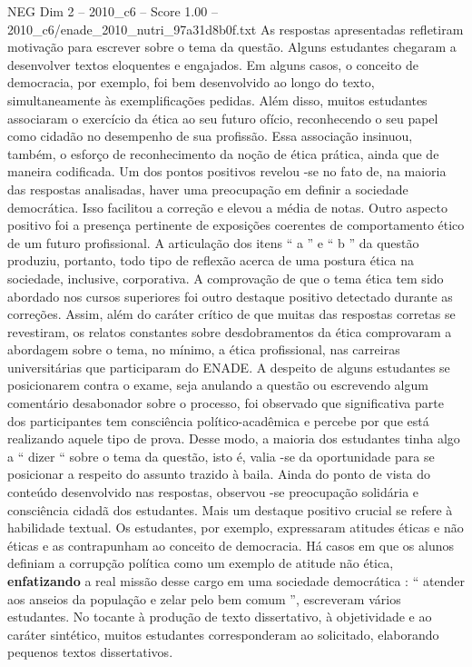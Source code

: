 \begin{textsample}{NEG Dim 2 – 2010\_c6 – Score 1.00 – 2010\_c6/enade\_2010\_nutri\_97a31d8b0f.txt}
As respostas apresentadas refletiram motivação para escrever sobre o tema da questão.
Alguns estudantes chegaram a desenvolver textos eloquentes e engajados.
Em alguns casos, o conceito de democracia, por exemplo, foi bem desenvolvido ao longo do texto, simultaneamente às exemplificações pedidas.
Além disso, muitos estudantes associaram o exercício da ética ao seu futuro ofício, reconhecendo o seu papel como cidadão no desempenho de sua profissão.
Essa associação insinuou, também, o esforço de reconhecimento da noção de ética prática, ainda que de maneira codificada.
Um dos pontos positivos revelou -se no fato de, na maioria das respostas analisadas, haver uma preocupação em definir a sociedade democrática.
Isso facilitou a correção e elevou a média de notas.
Outro aspecto positivo foi a presença pertinente de exposições coerentes de comportamento ético de um futuro profissional.
A articulação dos itens “ a ” e “ b ” da questão produziu, portanto, todo tipo de reflexão acerca de uma postura ética na sociedade, inclusive, corporativa.
A comprovação de que o tema ética tem sido abordado nos cursos superiores foi outro destaque positivo detectado durante as correções.
Assim, além do caráter crítico de que muitas das respostas corretas se revestiram, os relatos constantes sobre desdobramentos da ética comprovaram a abordagem sobre o tema, no mínimo, a ética profissional, nas carreiras universitárias que participaram do ENADE.
A despeito de alguns estudantes se posicionarem contra o exame, seja anulando a questão ou escrevendo algum comentário desabonador sobre o processo, foi observado que significativa parte dos participantes tem consciência político-acadêmica e percebe por que está realizando aquele tipo de prova.
Desse modo, a maioria dos estudantes tinha algo a “ dizer “ sobre o tema da questão, isto é, valia -se da oportunidade para se posicionar a respeito do assunto trazido à baila.
Ainda do ponto de vista do conteúdo desenvolvido nas respostas, observou -se preocupação solidária e consciência cidadã dos estudantes.
Mais um destaque positivo crucial se refere à habilidade textual.
Os estudantes, por exemplo, expressaram atitudes éticas e não éticas e as contrapunham ao conceito de democracia.
Há casos em que os alunos definiam a corrupção política como um exemplo de atitude não ética, \textbf{enfatizando} a real missão desse cargo em uma sociedade democrática : “ atender aos anseios da população e zelar pelo bem comum ”, escreveram vários estudantes.
No tocante à produção de texto dissertativo, à objetividade e ao caráter sintético, muitos estudantes corresponderam ao solicitado, elaborando pequenos textos dissertativos.

\end{textsample}
